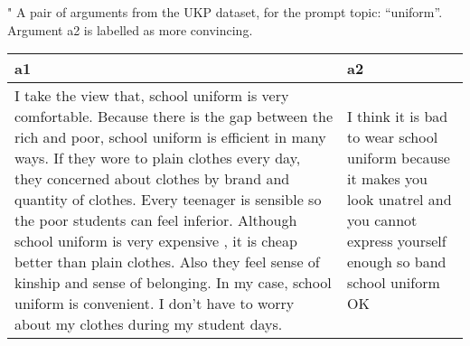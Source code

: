 \centering
\caption{"
              A pair of arguments from the UKP dataset, 
              for the prompt topic: ``uniform''. 
              Argument a2 is labelled as more convincing.
              }
\begin{tabular}{p{6cm}|p{6cm}}
\toprule
                                                                                                                                                                                                                                                                                                                                                                                                                                                                                                                                                                                     a1 &                                                                                                                                           a2 \\
\midrule
 I take the view that, school uniform is very comfortable. Because there is the gap between the rich and poor, school uniform is efficient in many ways. If they wore to plain clothes every day, they concerned about clothes by brand and quantity of clothes. Every teenager is sensible so the poor students can feel inferior. Although school uniform is very expensive , it is cheap better than plain clothes. Also they feel sense of kinship and sense of belonging. In my case, school uniform is convenient. I don't have to worry about my clothes during my student days. &  I think it is bad to wear school uniform because it makes you look unatrel and you cannot express yourself enough so band school uniform OK \\
\bottomrule
\end{tabular}

